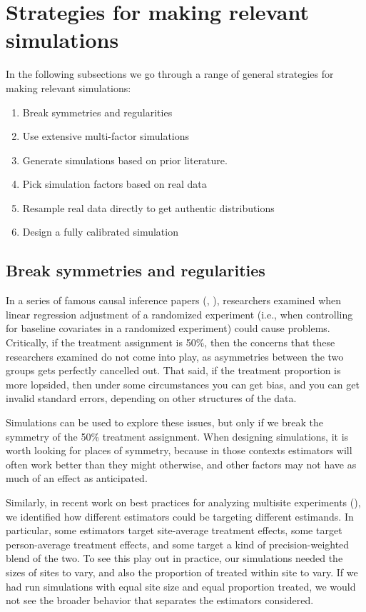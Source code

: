 \documentclass[
]{book}
\providecommand{\tightlist}{%
  \setlength{\itemsep}{0pt}\setlength{\parskip}{0pt}}
\begin{document}
\section{Strategies for making relevant simulations}\label{strategies-for-making-relevant-simulations}

In the following subsections we go through a range of general strategies for making relevant simulations:

\begin{enumerate}
\def\labelenumi{\arabic{enumi}.}
\tightlist
\item
  Break symmetries and regularities
\item
  Use extensive multi-factor simulations
\item
  Generate simulations based on prior literature.
\item
  Pick simulation factors based on real data
\item
  Resample real data directly to get authentic distributions
\item
  Design a fully calibrated simulation
\end{enumerate}

\subsection{Break symmetries and regularities}\label{break-symmetries-and-regularities}

In a series of famous causal inference papers (\citet{lin2013agnostic}, \citet{freedman2008regression}), researchers examined when linear regression adjustment of a randomized experiment (i.e., when controlling for baseline covariates in a randomized experiment) could cause problems.
Critically, if the treatment assignment is 50\%, then the concerns that these researchers examined do not come into play, as asymmetries between the two groups gets perfectly cancelled out.
That said, if the treatment proportion is more lopsided, then under some circumstances you can get bias, and you can get invalid standard errors, depending on other structures of the data.

Simulations can be used to explore these issues, but only if we break the symmetry of the 50\% treatment assignment.
When designing simulations, it is worth looking for places of symmetry, because in those contexts estimators will often work better than they might otherwise, and other factors may not have as much of an effect as anticipated.

Similarly, in recent work on best practices for analyzing multisite experiments (\citet{miratrix2021applied}), we identified how different estimators could be targeting different estimands.
In particular, some estimators target site-average treatment effects, some target person-average treatment effects, and some target a kind of precision-weighted blend of the two.
To see this play out in practice, our simulations needed the sizes of sites to vary, and also the proportion of treated within site to vary.
If we had run simulations with equal site size and equal proportion treated, we would not see the broader behavior that separates the estimators considered.
\end{document}
